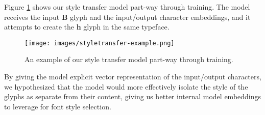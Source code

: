 Figure \ref{fig:styletransfer-example} shows our style transfer model part-way through training. The model receives the input \textbf{B} glyph and the input/output character embeddings, and it attempts to create the \textbf{h} glyph in the same typeface.

\begin{figure}[h]
    \centering
    \texttt{[image: images/styletransfer-example.png]}
    \caption{An example of our style transfer model part-way through training.}
    \label{fig:styletransfer-example}
\end{figure}

By giving the model explicit vector representation of the input/output characters, we hypothesized that the model would more effectively isolate the style of the glyphs as separate from their content, giving us better internal model embeddings to leverage for font style selection.